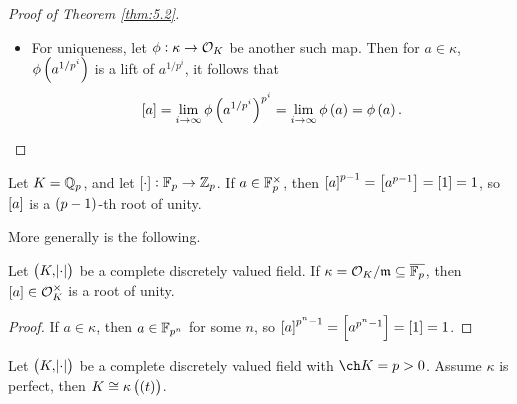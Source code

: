 \begin{proof}[Proof of Theorem \ref{thm:5.2}]
\begin{itemize}
\begin{enumerate}
\item We let $ b \in \kappa $ and we choose $ u_i \in \OOO_K $ a lift of $ b^{1 / p^i} $, and let $ z_i = u_i^{p^i} $. Then $ \lim_{i \to \infty} z_i = \sbr{b} $. Now $ u_iy_i $ is a lift of $ \br{ab}^{1 / p^i} $, hence
$$ \sbr{ab} = \lim_{i \to \infty} x_iz_i = \lim_{i \to \infty} x_i\lim_{i \to \infty} z_i = \sbr{a}\sbr{b}, $$
so $ 2 $ is satisfied. If $ \ch \OOO_K = p $, then $ y_i + u_i $ is a lift of $ a^{1 / p^i} + b^{1 / p^i} = \br{a + b}^{1 / p^i} $. Then
$$ \sbr{a + b} = \lim_{i \to \infty} \br{y_i + u_i}^{p^i} = \lim_{i \to \infty} \br{y_i^{p^i} + u_i^{p^i}} = \lim_{i \to \infty} \br{x_i + z_i} = \sbr{a} + \sbr{b}. $$
It is easy to check that $ \sbr{0} = 0 $ and $ \sbr{1} = 1 $, so $ \sbr{\cdot} $ is a ring homomorphism.
\end{enumerate}
\item For uniqueness, let $ \phi : \kappa \to \mathcal{O}_K $ be another such map. Then for $ a \in \kappa $, $ \phi\br{a^{1 / p^i}} $ is a lift of $ a^{1 / p^i} $, it follows that
$$ \sbr{a} = \lim_{i \to \infty} \phi\br{a^{1 / p^i}}^{p^i} = \lim_{i \to \infty} \phi\br{a} = \phi\br{a}. $$
\end{itemize}
\end{proof}

\begin{example}
Let $ K = \mathbb{Q}_p $, and let $ \sbr{\cdot} : \FF_p \to \ZZ_p $. If $ a \in \mathbb{F}_p^\times $, then $ \sbr{a}^{p - 1} = \sbr{a^{p - 1}} = \sbr{1} = 1 $, so $ \sbr{a} $ is a $ \br{p - 1} $-th root of unity.
\end{example}

More generally is the following.

\begin{lemma}
Let $ \br{K, \abs{\cdot}} $ be a complete discretely valued field. If $ \kappa = \mathcal{O}_K / \mathfrak{m} \subseteq \overline{\mathbb{F}_p} $, then $ \sbr{a} \in \OOO_K^\times $ is a root of unity.
\end{lemma}

\begin{proof}
If $ a \in \kappa $, then $ a \in \mathbb{F}_{p^n} $ for some $ n $, so $ \sbr{a}^{p^n - 1} = \sbr{a^{p^n - 1}} = \sbr{1} = 1 $.
\end{proof}

\begin{theorem}
\label{thm:5.7}
Let $ \br{K, \abs{\cdot}} $ be a complete discretely valued field with $ \ch K = p > 0 $. Assume $ \kappa $ is perfect, then $ K \cong \kappa\br{\br{t}} $.
\end{theorem}

